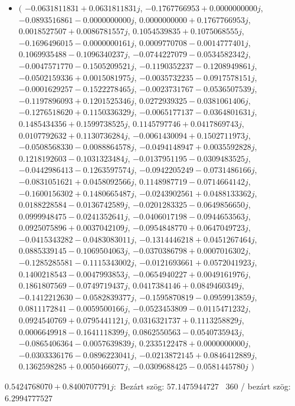 \documentclass[14pt,a4paper]{article}
\begin{document}
\begin{itemize}
\item
$\big($
$-0.0631811831+0.0631811831j$, $-0.1767766953+0.0000000000j$, $-0.0893516861-0.0000000000j$, $0.0000000000+0.1767766953j$, $0.0018527507+0.0086781557j$, $0.1054539835+0.1075068555j$, $-0.1696496015-0.0000000161j$, $0.0009770708-0.0014777401j$, $0.1069935488-0.1096340237j$, $-0.0744227079-0.0534582342j$, $-0.0047571770-0.1505209521j$, $-0.1190352237-0.1208949861j$, $-0.0502159336+0.0015081975j$, $-0.0035732235-0.0917578151j$, $-0.0001629257-0.1522278465j$, $-0.0023731767-0.0536507539j$, $-0.1197896093+0.1201525346j$, $0.0272939325-0.0381061406j$, $-0.1276518620+0.1150336329j$, $-0.0065177137-0.0364801631j$, $0.1485434356+0.1599738525j$, $0.1145797746+0.0417869743j$, $0.0107792632+0.1130736284j$, $-0.0061430094+0.1502711973j$, $-0.0508568330-0.0088864578j$, $-0.0494148947+0.0035592828j$, $0.1218192603-0.1031323484j$, $-0.0137951195-0.0309483525j$, $-0.0442986413-0.1263597574j$, $-0.0942205249-0.0731486166j$, $-0.0831051621+0.0458092566j$, $0.1148987719-0.0714664142j$, $-0.1600156302+0.1480665487j$, $-0.0243902561+0.0488133362j$, $0.0188228584-0.0136742589j$, $-0.0201283325-0.0649856650j$, $0.0999948475-0.0241352641j$, $-0.0406017198-0.0944653563j$, $0.0925075896+0.0037042109j$, $-0.0954848770+0.0647049723j$, $-0.0415343282-0.0483083011j$, $-0.1314446218+0.0451267464j$, $0.0885339145-0.1069504063j$, $-0.0370386798+0.0007016302j$, $-0.1285285581-0.1115343002j$, $-0.0121693661+0.0572041923j$, $0.1400218543-0.0047993853j$, $-0.0654940227+0.0049161976j$, $0.1861807569-0.0749719437j$, $0.0417384146+0.0849460349j$, $-0.1412212630-0.0582839377j$, $-0.1595870819-0.0959913859j$, $0.0811172841-0.0059500166j$, $-0.0523453809-0.0115471232j$, $0.0924540769+0.0795441121j$, $0.0316321737+0.1113258829j$, $0.0006649918-0.1641118399j$, $0.0862550563-0.0540735943j$, $-0.0865406364-0.0057639839j$, $0.2335122478+0.0000000000j$, $-0.0303336176-0.0896223041j$, $-0.0213872145+0.0846412889j$, $0.1362598285+0.0050466077j$, $-0.0309688425-0.0581445780j$
$\big)$
\end{itemize}
$0.5424768070+0.8400707791j$:\
Bezárt szög: $57.1475944727$ \
360 / bezárt szög: $6.2994777527$\
\end{document}
